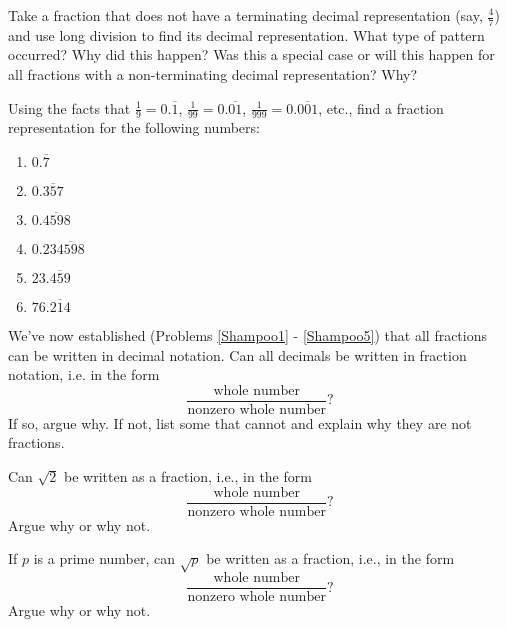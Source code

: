 \documentclass[nooutcomes]{ximera}
\begin{document}
\begin{problem} \label{Shampoo4}
Take a fraction that does not have a terminating decimal
representation (say, $\frac{4}{7}$) and use long division to find its
decimal representation.  What type of pattern occurred?  Why did this
happen?  Was this a special case or will this happen for all fractions
with a non-terminating decimal representation?  Why?

\end{problem}

\begin{problem}\label{Shampoo5}
Using the facts that $\frac{1}{9}=0.\overline{1}$,
$\frac{1}{99}=0.\overline{01}$, $\frac{1}{999}=0.\overline{001}$,
etc., find a fraction representation for the following numbers:

\begin{enumerate}
\item $0.\overline{7}$
\item $0.\overline{357}$
\item $0.\overline{4598}$
\item $0.23\overline{4598}$
\item $23.\overline{459}$
\item $76.\overline{214}$
\end{enumerate}


\end{problem}

\begin{problem} \label{Shampoo6}
We've now established (Problems \ref{Shampoo1} - \ref{Shampoo5}) that all fractions can be written in
decimal notation.  Can all decimals be written in fraction notation,
i.e. in the form \[ \frac{\text{whole number}}{\text{nonzero whole
    number}}?\] If so, argue why.  If not, list some that cannot and
explain why they are not fractions.

\end{problem}

\begin{problem}\label{Shampoo7}
Can $\sqrt{2}$ be written as a fraction, i.e., in the form 
\[ 
\frac{\text{whole number}}{\text{nonzero whole number}}?
\] 
Argue why or why not. 


\end{problem}

\begin{problem}\label{Shampoo8}
If $p$ is a prime number, can $\sqrt{p}$ be written as a fraction,
i.e., in the form 
\[ 
\frac{\text{whole number}}{\text{nonzero whole number}}?
\] 
Argue why or why not.
\end{problem} 
\end{document}
